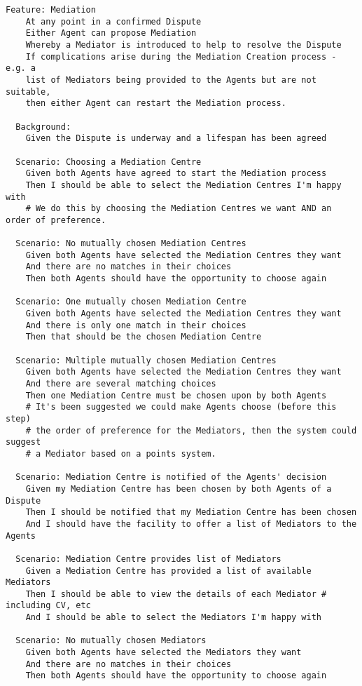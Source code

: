 \begin{lstlisting}
Feature: Mediation
    At any point in a confirmed Dispute
    Either Agent can propose Mediation
    Whereby a Mediator is introduced to help to resolve the Dispute
    If complications arise during the Mediation Creation process - e.g. a
    list of Mediators being provided to the Agents but are not suitable,
    then either Agent can restart the Mediation process.

  Background:
    Given the Dispute is underway and a lifespan has been agreed

  Scenario: Choosing a Mediation Centre
    Given both Agents have agreed to start the Mediation process
    Then I should be able to select the Mediation Centres I'm happy with
    # We do this by choosing the Mediation Centres we want AND an order of preference.

  Scenario: No mutually chosen Mediation Centres
    Given both Agents have selected the Mediation Centres they want
    And there are no matches in their choices
    Then both Agents should have the opportunity to choose again

  Scenario: One mutually chosen Mediation Centre
    Given both Agents have selected the Mediation Centres they want
    And there is only one match in their choices
    Then that should be the chosen Mediation Centre

  Scenario: Multiple mutually chosen Mediation Centres
    Given both Agents have selected the Mediation Centres they want
    And there are several matching choices
    Then one Mediation Centre must be chosen upon by both Agents
    # It's been suggested we could make Agents choose (before this step)
    # the order of preference for the Mediators, then the system could suggest
    # a Mediator based on a points system.

  Scenario: Mediation Centre is notified of the Agents' decision
    Given my Mediation Centre has been chosen by both Agents of a Dispute
    Then I should be notified that my Mediation Centre has been chosen
    And I should have the facility to offer a list of Mediators to the Agents

  Scenario: Mediation Centre provides list of Mediators
    Given a Mediation Centre has provided a list of available Mediators
    Then I should be able to view the details of each Mediator # including CV, etc
    And I should be able to select the Mediators I'm happy with

  Scenario: No mutually chosen Mediators
    Given both Agents have selected the Mediators they want
    And there are no matches in their choices
    Then both Agents should have the opportunity to choose again


\end{lstlisting}
